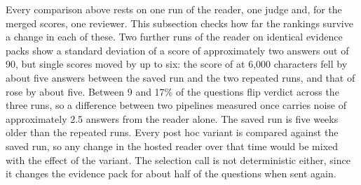 Every comparison above rests on one run of the reader, one judge and, for the merged scores, one reviewer. This subsection checks how far the rankings survive a change in each of these. Two further runs of the reader on identical evidence packs show a standard deviation of a score of approximately two answers out of 90, but single scores moved by up to six: the score of \lexb{} at 6,000 characters fell by about five answers between the saved run and the two repeated runs, and that of \setr{} rose by about five. Between 9 and 17\% of the questions flip verdict across the three runs, so a difference between two pipelines measured once carries noise of approximately 2.5 answers from the reader alone. The saved run is five weeks older than the repeated runs. Every post hoc variant is compared against the saved run, so any change in the hosted reader over that time would be mixed with the effect of the variant. The selection call is not deterministic either, since it changes the evidence pack for about half of the questions when sent again.

